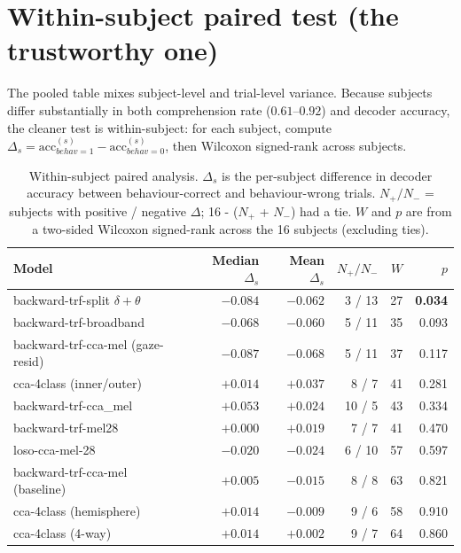\section{Within-subject paired test (the trustworthy one)}

The pooled table mixes subject-level and trial-level variance. Because
subjects differ substantially in both comprehension rate ($0.61$--$0.92$)
and decoder accuracy, the cleaner test is within-subject: for each
subject, compute $\Delta_s = \text{acc}_{behav=1}^{(s)} -
\text{acc}_{behav=0}^{(s)}$, then Wilcoxon signed-rank across subjects.

\begin{table}[ht]
\centering
\begin{tabular}{lrrrrr}
\toprule
Model & Median $\Delta_s$ & Mean $\Delta_s$ & $N_+/N_-$ & $W$ & $p$ \\
\midrule
backward-trf-split $\delta+\theta$ & $-0.084$ & $-0.062$ & 3 / 13 & 27 & \textbf{0.034} \\
backward-trf-broadband             & $-0.068$ & $-0.060$ & 5 / 11 & 35 & 0.093 \\
backward-trf-cca-mel (gaze-resid)  & $-0.087$ & $-0.068$ & 5 / 11 & 37 & 0.117 \\
cca-4class (inner/outer)           & $+0.014$ & $+0.037$ & 8 / 7  & 41 & 0.281 \\
backward-trf-cca\_mel              & $+0.053$ & $+0.024$ & 10 / 5 & 43 & 0.334 \\
backward-trf-mel28                 & $+0.000$ & $+0.019$ & 7 / 7  & 41 & 0.470 \\
loso-cca-mel-28                    & $-0.020$ & $-0.024$ & 6 / 10 & 57 & 0.597 \\
backward-trf-cca-mel (baseline)    & $+0.005$ & $-0.015$ & 8 / 8  & 63 & 0.821 \\
cca-4class (hemisphere)            & $+0.014$ & $-0.009$ & 9 / 6  & 58 & 0.910 \\
cca-4class (4-way)                 & $+0.014$ & $+0.002$ & 9 / 7  & 64 & 0.860 \\
\bottomrule
\end{tabular}
\caption{Within-subject paired analysis. $\Delta_s$ is the per-subject
difference in decoder accuracy between behaviour-correct and
behaviour-wrong trials. $N_+/N_-$ = subjects with positive / negative
$\Delta$; 16 - ($N_+$ + $N_-$) had a tie. $W$ and $p$ are from a
two-sided Wilcoxon signed-rank across the 16 subjects (excluding
ties).}
\end{table}

